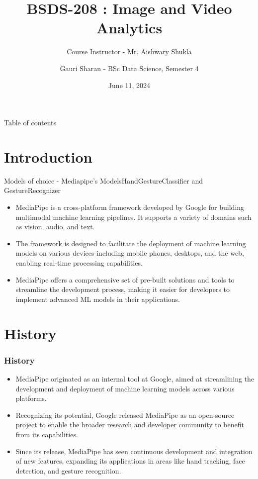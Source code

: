 \documentclass[aspectratio=169, hideothersubsections]{beamer}
\title{BSDS-208 : Image and Video Analytics}
\subtitle{Course Instructor - Mr. Aishwary Shukla}
\author[Gauri Sharan]{Gauri Sharan - BSc Data Science, Semester 4}
\date{June 11, 2024}
\begin{document}
\frame{\titlepage}

\begin{frame}{Table of contents}
    \tableofcontents[hideallsubsections]
\end{frame}

\section{Introduction}
\begin{frame}{Models of choice - Mediapipe's Models}{HandGestureClassifier and GestureRecognizer}
    \begin{itemize}
        \item MediaPipe is a cross-platform framework developed by Google for building multimodal machine learning pipelines. It supports a variety of domains such as vision, audio, and text.
        \item The framework is designed to facilitate the deployment of machine learning models on various devices including mobile phones, desktops, and the web, enabling real-time processing capabilities.
        \item MediaPipe offers a comprehensive set of pre-built solutions and tools to streamline the development process, making it easier for developers to implement advanced ML models in their applications.
    \end{itemize}
\end{frame}

\section{History}
\begin{frame}
    \frametitle{History}
    \begin{itemize}
        \item MediaPipe originated as an internal tool at Google, aimed at streamlining the development and deployment of machine learning models across various platforms.
        \item Recognizing its potential, Google released MediaPipe as an open-source project to enable the broader research and developer community to benefit from its capabilities.
        \item Since its release, MediaPipe has seen continuous development and integration of new features, expanding its applications in areas like hand tracking, face detection, and \alert{gesture recognition.}
    \end{itemize}
\end{frame}
\end{document}
